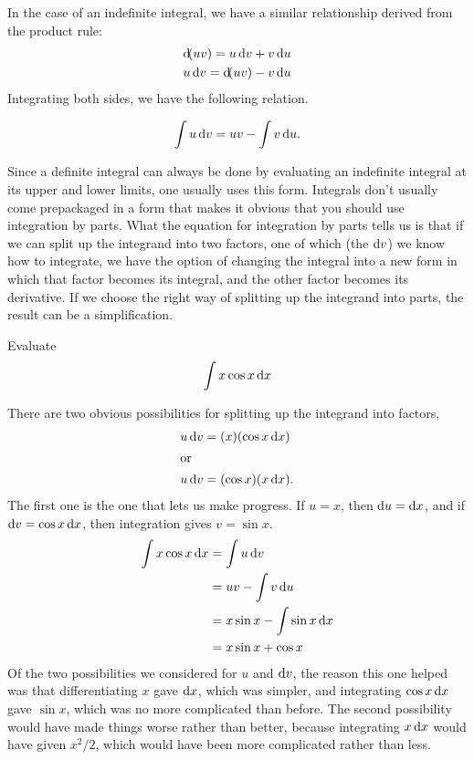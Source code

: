 In the case of an indefinite integral, we have a similar relationship
derived from the product rule:
\begin{gather*}
  \operatorname{d\!}(uv) = u \operatorname{d\!} v + v \operatorname{d\!} u \\
  u \operatorname{d\!} v = \operatorname{d\!}(uv) - v \operatorname{d\!} u 
\end{gather*}
Integrating both sides, we have the following relation.
\begin{important}
\begin{equation*}
  \int u \operatorname{d\!} v = uv - \int v \operatorname{d\!} u.
\end{equation*}
\end{important}
Since a definite integral can always be done by evaluating an indefinite
integral at its upper and lower limits, one usually uses this form.
Integrals don't usually come prepackaged in a form that makes it
obvious that you should use integration by parts. What the equation for
integration by parts tells us is that if we can split up the integrand
into two factors, one of which (the $\operatorname{d\!} v$) we know how to integrate, we have
the option of changing the integral into a new form in which that factor
becomes its integral, and the other factor becomes its derivative. If we
choose the right way of splitting up the integrand into parts, the result can be
a simplification.

\begin{eg}
\egquestion Evaluate
\begin{equation*}
  \int x \cos x \operatorname{d\!} x
\end{equation*}

\egquestion There are two obvious possibilities for splitting up the integrand
into factors,
\begin{align*}
  u \operatorname{d\!} v &= (x)(\cos x\operatorname{d\!} x) \\
\intertext{or}
  u \operatorname{d\!} v &= (\cos x)(x\operatorname{d\!} x).
\end{align*}
The first one is the one that lets us make progress. If $u=x$, then
$\operatorname{d\!} u=\operatorname{d\!} x$, and if $\operatorname{d\!} v=\cos x\operatorname{d\!} x$, then integration
gives $v=\sin x$.
\begin{align*}
  \int x \cos x \operatorname{d\!} x &= \int u \operatorname{d\!} v \\
                       &= uv - \int v \operatorname{d\!} u \\
                       &= x\sin x-\int \sin x \operatorname{d\!} x \\
                       &= x\sin x+\cos x
\end{align*}
Of the two possibilities we considered for $u$ and $\operatorname{d\!} v$, the reason
this one helped was that differentiating $x$ gave $\operatorname{d\!} x$, which was
simpler, and integrating $\cos x\operatorname{d\!} x$ gave $\sin x$, which was no
more complicated than before. The second possibility would have made
things worse rather than better, because integrating $x\operatorname{d\!} x$ would
have given $x^2/2$, which would have been more complicated rather than
less.
\end{eg}

